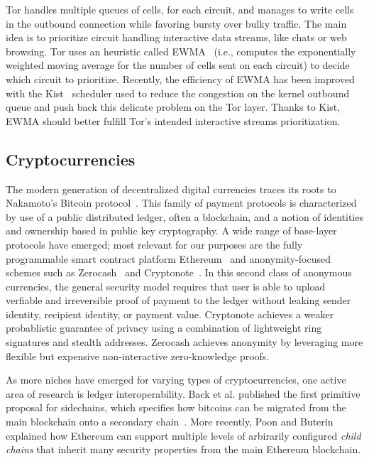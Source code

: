 Tor handles multiple queues of cells, for each circuit, and manages to write cells in the outbound connection while favoring bursty over bulky traffic. The main idea is to prioritize circuit handling interactive data streams, like chats or web browsing. Tor uses an heuristic called EWMA~\cite{ccs10-scheduling} (i.e., computes the exponentially weighted moving average for the number of cells sent on each circuit) to decide which circuit to prioritize. Recently, the efficiency of EWMA has been improved with the Kist~\cite{jansen14-kist} scheduler used to reduce the congestion on the kernel outbound queue and push back this delicate problem on the Tor layer. Thanks to Kist, EWMA should better fulfill Tor's intended interactive streams prioritization.

\subsection{Cryptocurrencies}

The modern generation of decentralized digital currencies traces its roots to
Nakamoto's Bitcoin protocol~\cite{nakamoto2008bitcoin}. This family of payment
protocols is characterized by use of a public distributed ledger, often a
blockchain, and a notion of identities and ownership based in public key
cryptography. A wide range of base-layer protocols have emerged; most
relevant for our purposes are the fully programmable smart contract platform
Ethereum~\cite{wood2014ethereum} and anonymity-focused schemes such as
Zerocash~\cite{sasson2014zerocash} and Cryptonote~\cite{van2013cryptonote}. In
this second class of anonymous currencies, the general security model requires
that user is able to upload verfiable and irreversible proof of payment to the
ledger without leaking sender identity, recipient identity, or payment
value. Cryptonote achieves a weaker probablistic guarantee of privacy using
a combination of lightweight ring signatures and stealth addresses. Zerocash
achieves anonymity by leveraging more flexible but expensive non-interactive
zero-knowledge proofs.

As more niches have emerged for varying types of cryptocurrencies, one active
area of research is ledger interoperability. Back et al. published the first
primitive proposal for sidechains, which specifies how bitcoins can be migrated
from the main blockchain onto a secondary chain~\cite{back2014enabling}.  More
recently, Poon and Buterin explained how Ethereum can support multiple levels of
arbirarily configured \emph{child chains} that inherit many security properties
from the main Ethereum blockchain.

